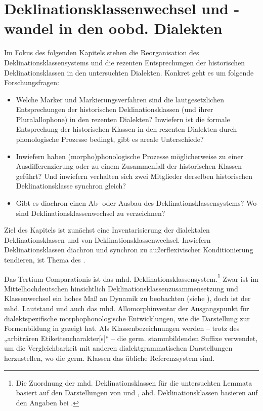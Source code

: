 \section{Deklinationsklassenwechsel und -wandel in den oobd. Dialekten}
\label{sec:8.2}
Im Fokus des folgenden Kapitels stehen die Reorganisation des Deklinationsklassensystems und die rezenten Entsprechungen der historischen Deklinationsklassen in den untersuchten Dialekten. Konkret geht es um folgende Forschungsfragen:

\begin{itemize}
\item Welche Marker und Markierungsverfahren sind die lautgesetzlichen Entsprechungen der historischen Deklinationsklassen (und ihrer Pluralallophone) in den rezenten Dialekten? Inwiefern ist die formale Entsprechung der historischen Klassen in den rezenten Dialekten durch phonologische Prozesse bedingt, gibt es areale Unterschiede?
\item Inwiefern haben (morpho)phonologische Prozesse möglicherweise zu einer Ausdifferenzierung oder zu einem Zusammenfall der historischen Klassen geführt? Und inwiefern verhalten sich zwei Mitglieder derselben historischen Deklinationsklasse synchron gleich?
\item Gibt es diachron einen Ab- oder Ausbau des Deklinationsklassensystems? Wo sind Deklinationsklassenwechsel zu verzeichnen?
\end{itemize}

Ziel des Kapitels ist zunächst eine Inventarisierung der dialektalen Deklinationsklassen und von Deklinationsklassenwechsel. Inwiefern Deklinationsklassen diachron und synchron zu außerflexivischer Konditionierung tendieren, ist Thema des .

\begin{sloppypar}
Das Tertium Comparationis ist das mhd. Deklinationsklassensystem.\footnote{Die Zuordnung der mhd. Deklinationsklassen für die untersuchten Lemmata basiert auf den Darstellungen von \citet{Paul1968} und \citet{Lexer1872-1878}, ahd. Deklinationsklassen basieren auf den Angaben bei \citet{BrauneHeidermanns2018}.} Zwar ist im Mittelhochdeutschen hinsichtlich Deklinationsklassenzusammensetzung und Klassenwechsel ein hohes Maß an Dynamik zu beobachten (siehe ), doch ist der mhd. Lautstand und auch das mhd. Allomorphinventar der Ausgangspunkt für dialektspezifische morphophonologische Entwicklungen, wie die Darstellung zur Formenbildung in  gezeigt hat. Als Klassenbezeichnungen werden -- trotz des „arbiträren Etikettencharakter[s]“ \citep[73]{Kürschner2008a} -- die germ. stammbildenden Suffixe verwendet, um die Vergleichbarkeit mit anderen dialektgrammatischen Darstellungen herzustellen, wo die germ. Klassen das übliche Referenzsystem sind.
\end{sloppypar}

